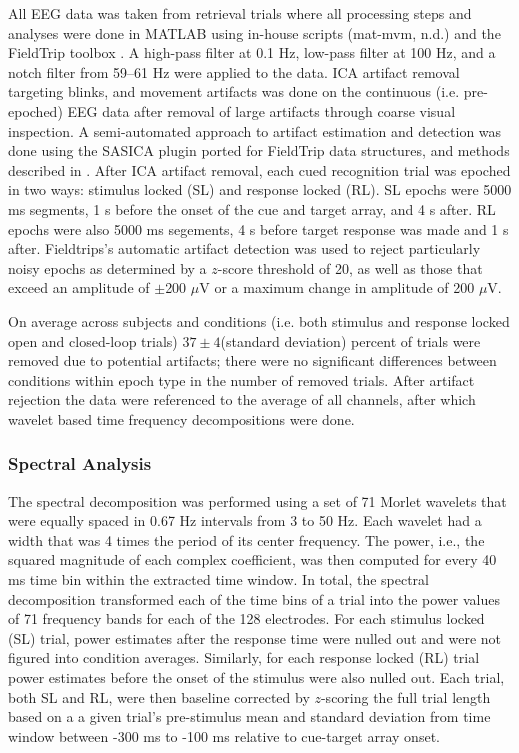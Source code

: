 \documentclass[11pt, titlepage, twoside]{article}
\begin{document}
All EEG data was taken from retrieval trials where all processing steps and analyses were done in MATLAB using in-house scripts (mat-mvm, n.d.) and the FieldTrip toolbox \cite{OostenveldFriesMarisEtAl11}. A high-pass filter at 0.1 Hz, low-pass filter at 100 Hz, and a notch filter from 59--61 Hz were applied to the data.  ICA artifact removal targeting blinks, and movement artifacts was done on the continuous (i.e. pre-epoched) EEG data after removal of large artifacts through coarse visual inspection.  A semi-automated approach to artifact estimation and detection was done using the SASICA plugin ported for FieldTrip data structures, and methods described in \textcite{ChaumonBishopBusch15}.  After ICA artifact removal, each cued recognition trial was epoched in two ways: stimulus locked (SL) and response locked (RL).  SL epochs were 5000 ms segments, 1 s before the onset of the cue and target array, and 4 s after. RL epochs were also 5000 ms segements, 4 s before target response was made and 1 s after.  Fieldtrips's automatic artifact detection was used to reject particularly noisy epochs as determined by a $z$-score threshold of 20, as well as those that exceed an amplitude of $\pm$200 $\mu$V or a maximum change in amplitude of 200 $\mu$V. 

On average across subjects and conditions (i.e. both stimulus and response locked open and closed-loop trials) $37\pm4$(standard deviation) percent of trials were removed due to potential artifacts; there were no significant differences between conditions within epoch type in the number of removed trials.  After artifact rejection the data were referenced to the average of all channels, after which wavelet based time frequency decompositions were done.

\subsubsection{Spectral Analysis}
\label{sec:deevSpecAnal}
The spectral decomposition was performed using a set of 71 Morlet wavelets that were equally spaced in 0.67 Hz intervals from 3 to 50 Hz. Each wavelet had a width that was 4 times the period of its center frequency. The power, i.e., the squared magnitude of each complex coefficient, was then computed for every 40 ms time bin within the extracted time window. In total, the spectral decomposition transformed each of the time bins of a trial into the power values of 71 frequency bands for each of the 128 electrodes.  For each stimulus locked (SL) trial, power estimates after the response time were nulled out and were not figured into condition averages.  Similarly, for each response locked (RL) trial power estimates before the onset of the stimulus were also nulled out.  Each trial, both SL and RL, were then baseline corrected by $z$-scoring the full trial length based on a a given trial's pre-stimulus mean and standard deviation from time window between -300 ms to -100 ms relative to cue-target array onset.  
\end{document}
